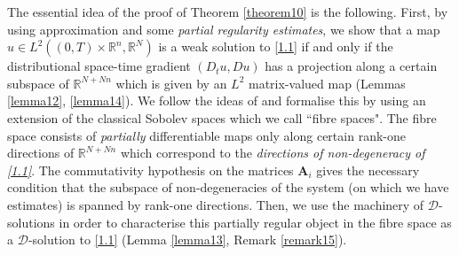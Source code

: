 \documentclass{amsart}
\theoremstyle{definition}
\numberwithin{equation}{section}
\begin{document}
The essential idea of the proof of Theorem \ref{theorem10} is the following. First, by using  approximation and some \emph{partial regularity estimates}, we show that a map $u\in L^2((0,T){\times}{\mathbb{R}}^n,{\mathbb{R}}^N)$ is a weak solution to \eqref{1.1} if and only if the distributional space-time gradient $(D_t u,Du)$ has a projection along a certain subspace of ${\mathbb{R}}^{N+Nn}$ which is given by an $L^2$ matrix-valued map (Lemmas \ref{lemma12}, \ref{lemma14}). We follow the ideas of \cite{K8} and formalise this by using an extension of the classical Sobolev spaces which we call ``fibre spaces". The fibre space consists of \emph{partially} differentiable maps only along certain rank-one directions of ${\mathbb{R}}^{N+Nn}$ which correspond to the \emph{directions of non-degeneracy of \eqref{1.1}}. The commutativity hypothesis on the matrices ${\textbf{A}}_i$ gives the necessary condition that the subspace of non-degeneracies of the system (on which we have estimates) is spanned by rank-one directions. Then, we use the machinery of ${\mathcal{D}}$-solutions in order to characterise this partially regular object in the fibre space as a ${\mathcal{D}}$-solution to \eqref{1.1} (Lemma \ref{lemma13}, Remark \ref{remark15}).
 
\end{document}

